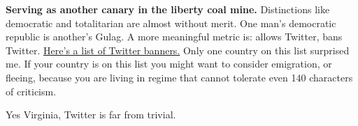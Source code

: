 \textbf{Serving as another canary in the liberty coal mine.}
Distinctions like democratic and totalitarian are almost without merit.
One man's democratic republic is another's Gulag. A more meaningful
metric is: allows Twitter, bans Twitter.
\href{http://www.buzzfeed.com/miriamberger/11-countries-where-twitter-is-not-free}{Here's
a list of Twitter banners.} Only one country on this list surprised me.
If your country is on this list you might want to consider emigration,
or fleeing, because you are living in regime that cannot tolerate even
140 characters of criticism.

Yes Virginia, Twitter is far from trivial.



%